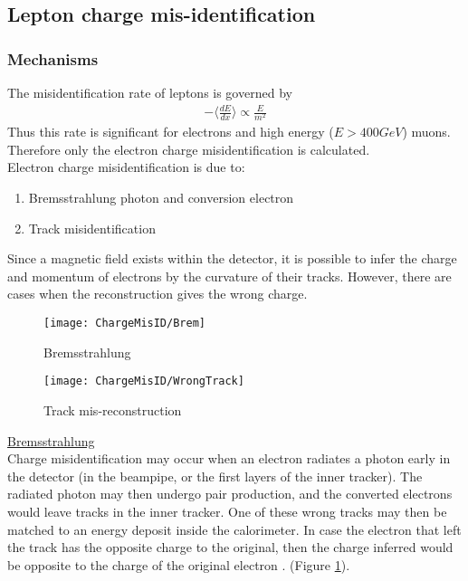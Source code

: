 \subsection{Lepton charge mis-identification}
\subsubsection*{Mechanisms}
The misidentification rate of leptons is governed by \\
\begin{align}
-\langle\frac{dE}{dx}\rangle \varpropto \frac{E}{m^2}
\end{align}
Thus this rate is significant for electrons and high energy ($E > 400GeV$) muons. Therefore only the electron charge misidentification is calculated. \\

Electron charge misidentification is due to:
\begin{enumerate}
\item Bremsstrahlung photon and conversion electron
\item Track misidentification
\end{enumerate}

Since a magnetic field exists within the detector, it is possible to infer the charge and momentum of electrons by the curvature of their tracks. However, there are cases when the reconstruction gives the wrong charge. 

\begin{figure}[h]
\centering
\texttt{[image: ChargeMisID/Brem]}
\caption[Electron charge misidentification by bremsstrahlung]{Bremsstrahlung}
\label{fig:brem}
\end{figure}
\begin{figure}[h]
\centering
\texttt{[image: ChargeMisID/WrongTrack]}
\caption[Electron charge misidentification by track mis-reconstruction]{Track mis-reconstruction}
\label{fig:wrong-track}
\end{figure}

\underline{Bremsstrahlung} \\
Charge misidentification may occur when an electron radiates a photon early in the detector (in the beampipe, or the first layers of the inner tracker). The radiated photon may then undergo pair production, and the converted electrons would leave tracks in the inner tracker.  One of these wrong tracks may then be matched to an energy deposit inside the calorimeter. In case the electron that left the track has the opposite charge to the original, then the charge inferred would be opposite to the charge of the original electron \cite{ElectronReco2011}. (Figure \ref{fig:brem}). 


